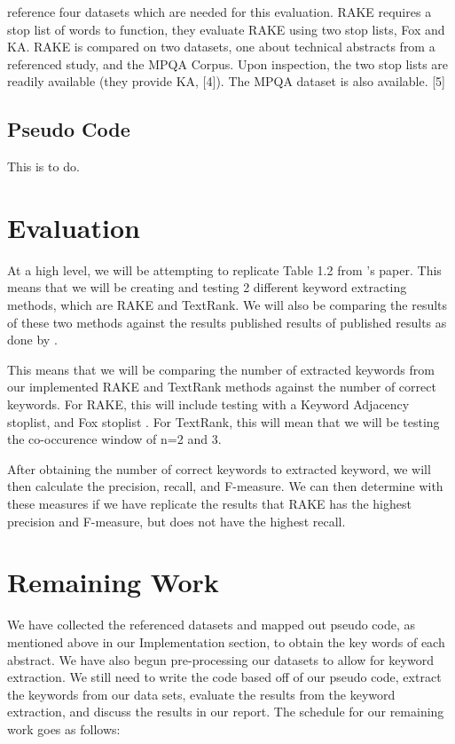\documentclass[11pt,a4paper]{article}
\begin{document}
\citet{1} reference four datasets which are needed for this evaluation. RAKE requires a stop list of words to function, they evaluate RAKE using two stop lists, Fox and KA. RAKE is compared on two datasets, one about technical abstracts from a referenced study, and the MPQA Corpus. Upon inspection, the two stop lists are readily available (they provide KA, [4]). The MPQA dataset is also available. [5]

\subsection {Pseudo Code}
This is to do.

\section{Evaluation}

At a high level, we will be attempting to replicate Table 1.2 from 's paper. This means that we will be creating and testing 2 different keyword extracting methods, which are RAKE and TextRank. We will also be comparing the results of these two methods against the results published  results of  published results as done by \citet{1}. 

This means that we will be comparing the number of extracted keywords from our implemented RAKE and TextRank methods against the number of correct keywords. For RAKE, this will include testing with a Keyword Adjacency stoplist, and Fox stoplist \citep{fox}. For TextRank, this will mean that we will be testing the co-occurence window of n=2 and 3.

After obtaining the number of correct keywords to extracted keyword, we will then calculate the precision, recall, and F-measure. We can then determine with these measures if we have replicate the results that RAKE has the highest precision and F-measure, but does not have the highest recall. 

\section{Remaining Work}

We have collected the referenced datasets and mapped out pseudo code, as mentioned above in our Implementation section, to obtain the key words of each abstract. We have also begun pre-processing our datasets to allow for keyword extraction. We still need to write the code based off of our pseudo code, extract the keywords from our data sets, evaluate the results from the keyword extraction, and discuss the results in our report. The schedule for our remaining work goes as follows:
\end{document}
